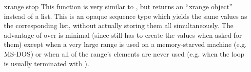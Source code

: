 \begin{funcdesc}{xrange}{ stop}
This function is very similar to , but returns an
``xrange object'' instead of a list.  This is an opaque sequence type
which yields the same values as the corresponding list, without
actually storing them all simultaneously.  The advantage of
 over  is minimal (since
 still has to create the values when asked for
them) except when a very large range is used on a memory-starved
machine (e.g. MS-DOS) or when all of the range's elements are never
used (e.g. when the loop is usually terminated with ).
\end{funcdesc}
